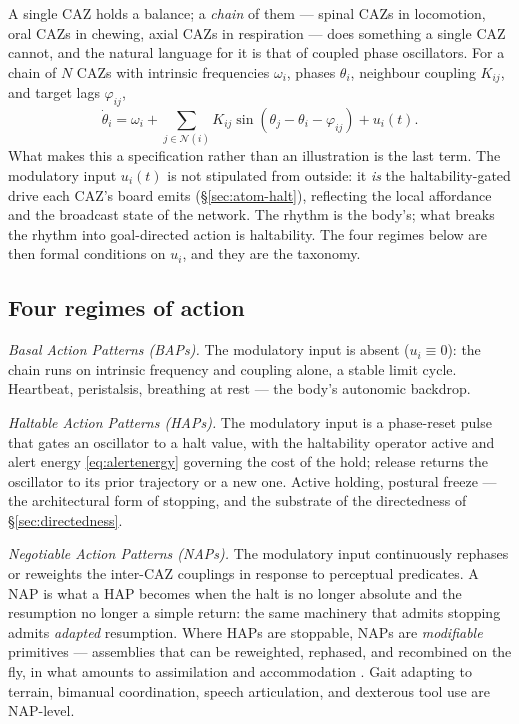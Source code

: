 \documentclass{article}
\begin{document}
A single CAZ holds a balance; a \emph{chain} of them --- spinal CAZs in
locomotion, oral CAZs in chewing, axial CAZs in respiration --- does
something a single CAZ cannot, and the natural language for it is that of
coupled phase oscillators.  For a chain of $N$ CAZs with intrinsic
frequencies $\omega_i$, phases $\theta_i$, neighbour coupling $K_{ij}$,
and target lags $\varphi_{ij}$,
\begin{equation}
\dot\theta_i = \omega_i + \sum_{j\in\mathcal N(i)}
   K_{ij}\sin(\theta_j - \theta_i - \varphi_{ij}) + u_i(t).
\label{eq:kuramoto}
\end{equation}
What makes this a specification rather than an illustration is the last
term.  The modulatory input $u_i(t)$ is not stipulated from outside: it
\emph{is} the haltability-gated drive each CAZ's board emits
(\S\ref{sec:atom-halt}), reflecting the local affordance and the
broadcast state of the network.  The rhythm is the body's; what breaks
the rhythm into goal-directed action is haltability.  The four regimes
below are then formal conditions on $u_i$, and they are the taxonomy.

\subsection{Four regimes of action}\label{sec:tax-regimes}

\emph{Basal Action Patterns (BAPs).}  The modulatory input is absent
($u_i\equiv 0$): the chain runs on intrinsic frequency and coupling
alone, a stable limit cycle.  Heartbeat, peristalsis, breathing at rest
--- the body's autonomic backdrop.

\emph{Haltable Action Patterns (HAPs).}  The modulatory input is a
phase-reset pulse that gates an oscillator to a halt value, with the
haltability operator active and alert energy \eqref{eq:alertenergy}
governing the cost of the hold; release returns the oscillator to its
prior trajectory or a new one.  Active holding, postural freeze --- the
architectural form of stopping, and the substrate of the directedness of
\S\ref{sec:directedness}.

\emph{Negotiable Action Patterns (NAPs).}  The modulatory input
continuously rephases or reweights the inter-CAZ couplings in response to
perceptual predicates.  A NAP is what a HAP becomes when the halt is no
longer absolute and the resumption no longer a simple return: the same
machinery that admits stopping admits \emph{adapted} resumption.  Where
HAPs are stoppable, NAPs are \emph{modifiable} primitives --- assemblies
that can be reweighted, rephased, and recombined on the fly, in what
amounts to assimilation and accommodation
\citep{Piaget1952Origins,Kelso1995,HakenKelsoBunz1985PhaseTransitions,BizziCheung2013}.
Gait adapting to terrain, bimanual coordination, speech articulation, and
dexterous tool use are NAP-level.
\end{document}
